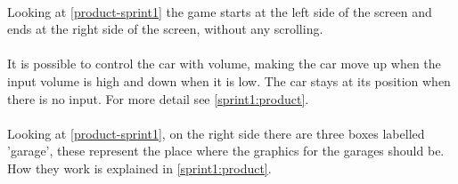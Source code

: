 \paragraph{}\label{sprint1:req1}
Looking at \cref{product-sprint1} the game starts at the left side of the screen and ends at the right side of the screen, without any scrolling.
\paragraph{}\label{sprint1:req2}
It is possible to control the car with volume, making the car move up when the input volume is high and down when it is low.
The car stays at its position when there is no input.
For more detail see \cref{sprint1:product}.
\paragraph{}\label{sprint1:req4}
Looking at \cref{product-sprint1}, on the right side there are three boxes labelled 'garage', these represent the place where the graphics for the garages should be.
How they work is explained in \cref{sprint1:product}.
